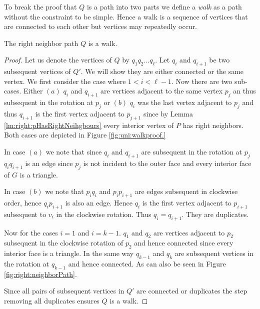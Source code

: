   To break the proof that $Q$ is a path into two parts we define a \emph{walk} as a path without the constraint to be simple. Hence a walk is a sequence of vertices that are connected to each other but vertices may repeatedly occur.
  \begin{lemma}
    \label{lm:uni:neighborWalk}
    The right neighbor path $Q$ is a walk.
  \end{lemma}
  \begin{proof}
    Let us denote the vertices of $Q$ by $q_1 q_2 \ldots q_\ell$.
    Let $q_i$ and $q_{i+1}$ be two subsequent vertices of $Q'$. We will show they are either connected or the same vertex. We first consider the case where $1 < i < \ell-1$.
    Now there are two sub-cases. Either $(a)$ $q_i$ and $ q_{i+1}$ are vertices adjacent to the same vertex $p_j$ an thus subsequent in the rotation at $p_j$ or $(b)$ $q_i$ was the last vertex adjacent to $p_j$ and thus $q_{i+1}$ is the first vertex adjacent to $p_{j+1}$ since by Lemma \ref{lm:right:pHasRightNeihgbours} every interior vertex of $P$ has right neighbors.
    Both cases are depicted in Figure \ref{fig:uni:walkproof.}

    In case $(a)$ we note that since $q_i$ and $q_{i+1}$ are subsequent in the rotation at $p_j$ $q_i q_{i+1}$ is an edge since $p_j$ is not incident to the outer face and every interior face of $G$ is a triangle.

    In case $(b)$ we note that $p_i q_i$ and $p_i p_{i+1}$ are edges subsequent in clockwise order, hence $q_{i} p_{i+1}$ is also an edge. Hence $q_i$ is the first vertex adjacent to $p_{i+1}$ subsequent to $v_i$ in the clockwise rotation. Thus $q_{i} = q_{i+1}$. They are duplicates.

    Now for the cases $i=1$ and $i=k-1$. $q_1$ and $q_2$ are vertices adjacent to $p_{2}$ subsequent in the clockwise rotation of ${p_2}$ and hence connected since every interior face is a triangle. In the same way $q_{k-1}$ and $q_k$ are subsequent vertices in the rotation at $q_{k-1}$ and hence connected. As can also be seen in Figure \ref{fig:right:neighborPath}.

    Since all pairs of subsequent vertices in $Q'$ are connected or duplicates the step removing all duplicates ensures $Q$ is a walk.


\end{proof}
